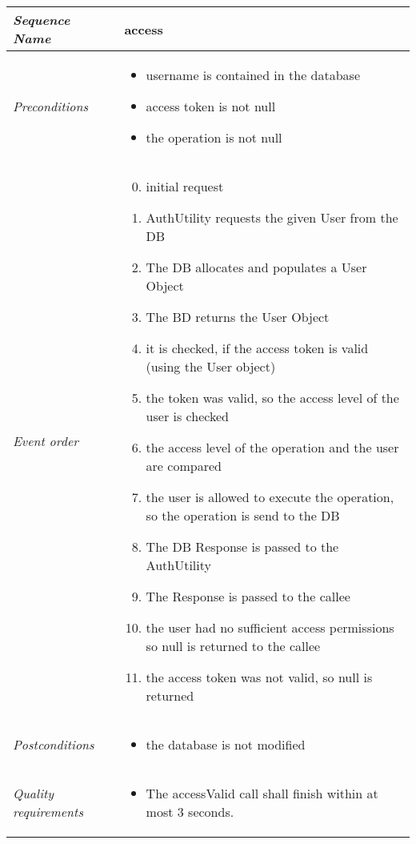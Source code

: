 				\begin{tabular}{|p{}|p{}|}
					\hline
					\textit{Sequence Name}&\textbf{access}\\
					\hline
					\textit{Preconditions}&
					\begin{itemize}
						\setcounter{enumi}{-1}
						\item username is contained in the database
						\item access token is not null
						\item the operation is not null
					\end{itemize}\\
					\hline
					\textit{Event order}&
					\begin{enumerate}[1.]
						\setcounter{enumi}{-1}
						\item initial request
						\item AuthUtility requests the given User from the DB
						\item The DB allocates and populates a User Object
						\item The BD returns the User Object
						\item it is checked, if the access token is valid (using the User object)
						\addtocounter{enumi}{1}
						\item the token was valid, so the access level of the user is checked
						\addtocounter{enumi}{1}
						\item the access level of the operation and the user are compared
						\item the user is allowed to execute the operation, so the operation is send to the DB
						\item The DB Response is passed to the AuthUtility
						\item The Response is passed to the callee
						\item the user had no sufficient access permissions so null is returned to the callee
						\item the access token was not valid, so null is returned
					\end{enumerate}\\
					\hline
					\textit{Postconditions}&
					\begin{itemize}
						\item the database is not modified
					\end{itemize}\\
					\hline
					\textit{Quality requirements}&
					\begin{itemize}
						\item The accessValid call shall finish within at most 3 seconds.
					\end{itemize}\\
					\hline
				\end{tabular}
